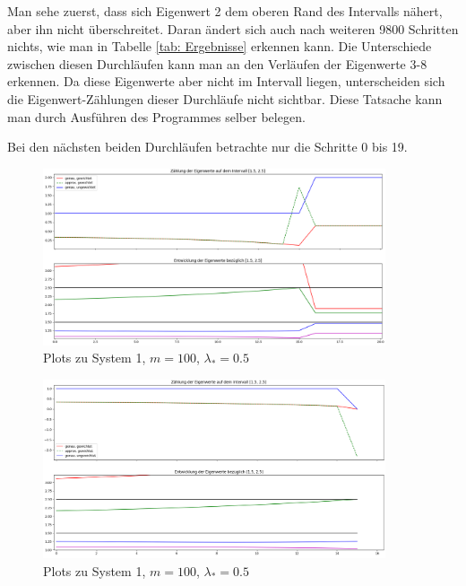 \documentclass[a4paper,12pt]{report}
\newcommand{\1}{\mathds{1}}
\theoremstyle{plain} %
\theoremstyle{definition} %
\theoremstyle{remark}
\begin{document}
            Man sehe zuerst, dass sich Eigenwert 2 dem oberen Rand des Intervalls nähert, aber ihn nicht überschreitet.
            Daran ändert sich auch nach weiteren 9800 Schritten nichts, wie man in Tabelle \ref{tab: Ergebnisse} erkennen kann.
            Die Unterschiede zwischen diesen Durchläufen kann man an den Verläufen der Eigenwerte 3-8 erkennen.
            Da diese Eigenwerte aber nicht im Intervall liegen, unterscheiden sich die Eigenwert-Zählungen dieser Durchläufe nicht sichtbar.
            Diese Tatsache kann man durch Ausführen des Programmes selber belegen.

            Bei den nächsten beiden Durchläufen betrachte nur die Schritte 0 bis 19. 

            \begin{figure}[h!t]
                  \centering
                  \includegraphics[width=0.9\textwidth, keepaspectratio]{./Original/Plot_1_100_0.5.png}
                  \caption{Plots zu System 1, $m=100$, $\lambda_*=0.5$}
                  \label{fig: Plot_1_100_0.5}
            \end{figure}

            \begin{figure}[h!t]
                  \centering
                  \includegraphics[width=0.9\textwidth, keepaspectratio]{./Original/Plot_1_150_0.5.png}
                  \caption{Plots zu System 1, $m=100$, $\lambda_*=0.5$}
                  \label{fig: Plot_1_150_0.5}
            \end{figure}
\end{document}

